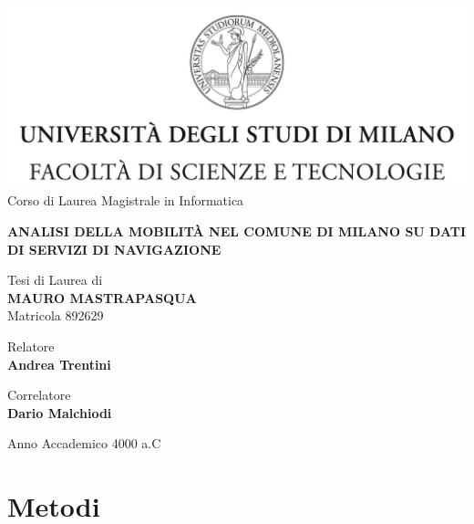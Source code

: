 \documentclass[12pt]{report}
\begin{document}
\begin{titlepage}
	\begin{center}
		\includegraphics[width=\textwidth]{Logo.jpg}
		\large{Corso di Laurea Magistrale in Informatica}
		
		\vspace{1.4cm}
		
		\LARGE{\textbf{ANALISI DELLA MOBILITÀ NEL COMUNE DI MILANO SU DATI DI SERVIZI DI NAVIGAZIONE}}
		
		\vspace{1.4cm}
		
		\large{Tesi di Laurea di} \\
		\large{\textbf{MAURO MASTRAPASQUA}} \\
		\large{Matricola 892629}
	\end{center}

	\begin{flushleft}
		\vspace{1.0cm}
		
		\normalsize{Relatore} \\
		\normalsize{\textbf{Andrea Trentini}}

		\vspace{0.4cm}

		\normalsize{Correlatore} \\
		\normalsize{\textbf{Dario Malchiodi}}
	\end{flushleft}

	\begin{center}
		\vspace{0.7cm}
		
		\large{Anno Accademico 4000 a.C}
	\end{center}
\end{titlepage}

\tableofcontents
\listoftodos

\chapter{Metodi}




\end{document}

